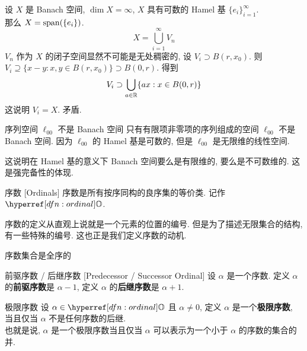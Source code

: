         \begin{prf}
            设 \(X\) 是 Banach 空间, \(\dim X=\infty\), \(X\) 具有可数的 Hamel 基 \(\{e_i\}_{i=1}^{\infty}\). \\
            那么 \(X=\operatorname{span}(\{e_i\})\). 
            \[X=\bigcup_{i=1}^{\infty}V_n\]
            \(V_n\) 作为 \(X\) 的闭子空间显然不可能是无处稠密的, 设 $V_i \supset B(r,x_0)$. 则 $V_i \supseteq\{x-y: x,y\in B(r,x_0)\} \supset B(0,r)$. 得到
            \[V_i\supset\bigcup_{a\in\operatorname{\mathbb{R}}}\{ax: x\in B(0,r)\} \]
            这说明 \(V_i=X\). 矛盾.
        \end{prf}

        \begin{xmp}
            {序列空间 \(\ell_{00}\) 不是 Banach 空间}
            只有有限项非零项的序列组成的空间 \(\ell_{00}\) 不是 Banach 空间. 因为 \(\ell_{00}\) 的 Hamel 基是可数的, 但是 \(\ell_{00}\) 是无限维的线性空间.
        \end{xmp}

        \begin{rmk}
            这说明在 Hamel 基的意义下 Banach 空间要么是有限维的, 要么是不可数维的. 这是强完备性的体现.
        \end{rmk}

        \begin{dfn}
            [ordinal]
            {序数}
            [Ordinals]
            序数是所有按序同构的良序集的等价类. 记作 \(\ordinal\).
        \end{dfn}
        
        \begin{rmk}
            [Dedicatia]
            序数的定义从直观上说就是一个元素的位置的编号. 但是为了描述无限集合的结构, 有一些特殊的编号. 这也正是我们定义序数的动机.
        \end{rmk}

        \begin{ppt}
            {序数集合是全序的}
        \end{ppt}

        \begin{dfn}
            {前驱序数 / 后继序数}
            [Predecessor / Successor Ordinal]
            设 \(\alpha\) 是一个序数. 定义 \(\alpha\) 的\textbf{前驱序数}是 \(\alpha-1\), 定义 \(\alpha\) 的\textbf{后继序数}是 \(\alpha+1\).
        \end{dfn}

        \begin{dfn}
            {极限序数}
            设 \(\alpha\in\ordinal\) 且 \(\alpha\neq 0\), 定义 \(\alpha\) 是一个\textbf{极限序数}, 当且仅当 \(\alpha\) 不是任何序数的后继. \\
            也就是说, \(\alpha\) 是一个极限序数当且仅当 \(\alpha\) 可以表示为一个小于 \(\alpha\) 的序数的集合的并.
        \end{dfn}

